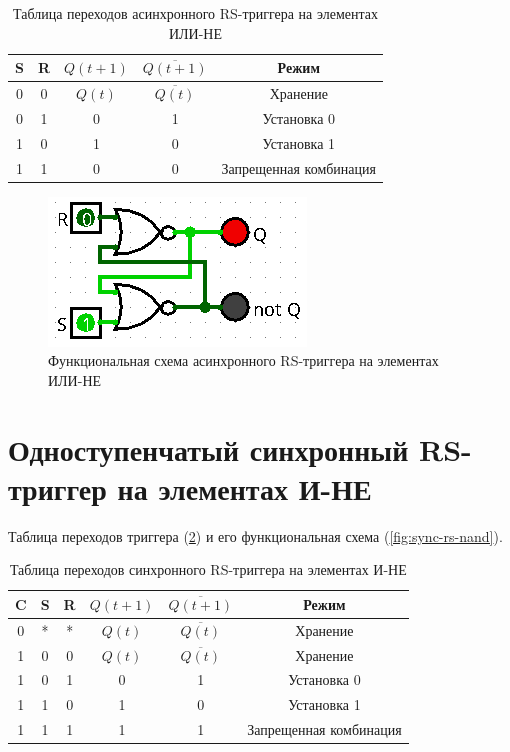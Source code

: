 \documentclass[14pt, a4paper]{extreport}
\begin{document}
\begin{table}[H]
	\caption{Таблица переходов асинхронного RS-триггера на элементах ИЛИ-НЕ}
	\label{tab:async-rs-nor}
	\begin{tabular}{|c|c|c|c|c|}
		\hline
		S & R & $Q(t + 1)$ & $\overline{Q(t + 1)}$ & Режим \\
		\hline
		0 & 0 & $Q(t)$ & $\overline{Q(t)}$ & Хранение \\
		\hline
		0 & 1 & 0 & 1 & Установка 0 \\
		\hline
		1 & 0 & 1 & 0 & Установка 1 \\
		\hline
		1 & 1 & 0 & 0 & Запрещенная комбинация \\
		\hline
	\end{tabular}
\end{table}

\begin{figure}[H]
	\caption{Функциональная схема асинхронного RS-триггера на элементах ИЛИ-НЕ}
	\label{fig:async-rs-nor}
	\includegraphics[width=\textwidth]{async-rs-nor}
\end{figure}

\section{Одноступенчатый синхронный RS-триггер на элементах И-НЕ}
Таблица переходов триггера (\cref{tab:sync-rs-nand}) и его функциональная схема (\cref{fig:sync-rs-nand}).

\begin{table}[H]
	\caption{Таблица переходов синхронного RS-триггера на элементах И-НЕ}
	\label{tab:sync-rs-nand}
	\begin{tabular}{|c|c|c|c|c|c|}
		\hline
		C & S & R & $Q(t + 1)$ & $\overline{Q(t + 1)}$ & Режим \\
		\hline
		0 & * & * & $Q(t)$ & $\overline{Q(t)}$ & Хранение \\
		\hline
		1 & 0 & 0 & $Q(t)$ & $\overline{Q(t)}$ & Хранение \\
		\hline
		1 & 0 & 1 & 0 & 1 & Установка 0 \\
		\hline
		1 & 1 & 0 & 1 & 0 & Установка 1 \\
		\hline
		1 & 1 & 1 & 1 & 1 & Запрещенная комбинация \\
		\hline
	\end{tabular}
\end{table}
\end{document}
